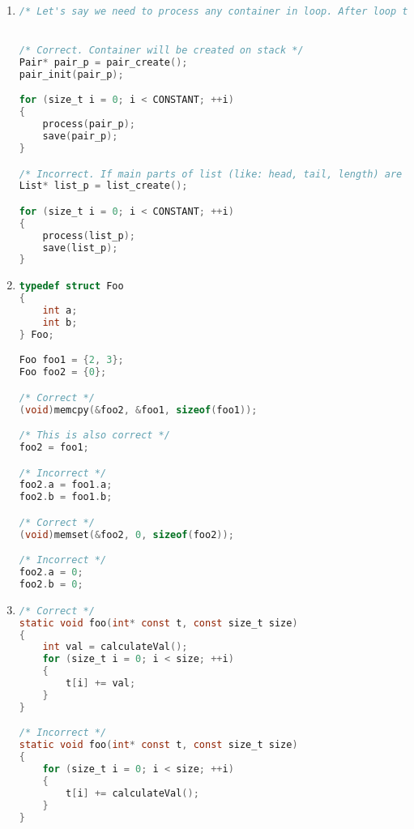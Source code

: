 \begin{enumerate}
\begin{lstlisting}[language=C,style=C99]
    /* some code */
}

/* Incorrect */
void foo(int* const a_p, const size_t size)
{
    for (size_t i = 0; i < size; ++i)
    {
        *a_p += bar(i);
    }
    
    /* some code */
}
\end{lstlisting}
    
    \item 
\begin{lstlisting}[language=C,style=C99]
/* Let's say we need to process any container in loop. After loop this container is no longer needed */


/* Correct. Container will be created on stack */
Pair* pair_p = pair_create();
pair_init(pair_p);

for (size_t i = 0; i < CONSTANT; ++i)
{
    process(pair_p);
    save(pair_p);
}

/* Incorrect. If main parts of list (like: head, tail, length) are on the stack, but every single node on heap, there is no sense. Still we process container allocated at heap */
List* list_p = list_create();

for (size_t i = 0; i < CONSTANT; ++i)
{
    process(list_p);
    save(list_p);
}
\end{lstlisting}
    
    \item 
\begin{lstlisting}[language=C,style=C99]
typedef struct Foo
{
    int a;
    int b;
} Foo;

Foo foo1 = {2, 3};
Foo foo2 = {0};

/* Correct */
(void)memcpy(&foo2, &foo1, sizeof(foo1));

/* This is also correct */
foo2 = foo1;

/* Incorrect */
foo2.a = foo1.a;
foo2.b = foo1.b;

/* Correct */
(void)memset(&foo2, 0, sizeof(foo2));

/* Incorrect */
foo2.a = 0;
foo2.b = 0;
\end{lstlisting}
    
    \item
\begin{lstlisting}[language=C,style=C99]
/* Correct */
static void foo(int* const t, const size_t size)
{
    int val = calculateVal();
    for (size_t i = 0; i < size; ++i)
    {
        t[i] += val;
    }
}

/* Incorrect */
static void foo(int* const t, const size_t size)
{
    for (size_t i = 0; i < size; ++i)
    {
        t[i] += calculateVal();
    }
}



\end{lstlisting}
\end{enumerate}
